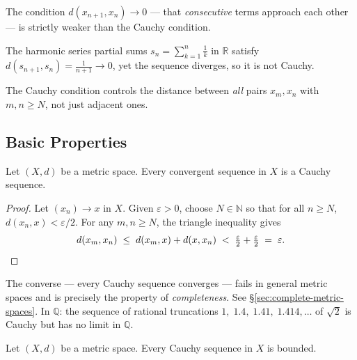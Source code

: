 \begin{remark*}
The condition $d(x_{n+1}, x_n) \to 0$ --- that \emph{consecutive} terms
approach each other --- is strictly weaker than the Cauchy condition.

The harmonic series partial sums $s_n = \sum_{k=1}^n \frac{1}{k}$ in
$\mathbb{R}$ satisfy $d(s_{n+1}, s_n) = \frac{1}{n+1} \to 0$, yet the
sequence diverges, so it is not Cauchy.

The Cauchy condition controls the distance between \emph{all} pairs
$x_m, x_n$ with $m,n \ge N$, not just adjacent ones.
\end{remark*}

\subsection{Basic Properties}
\label{sec:cauchy-basic-properties}

\begin{proposition}
\label{prop:convergent-implies-cauchy}
Let $(X,d)$ be a metric space.
Every convergent sequence in $X$ is a Cauchy sequence.
\end{proposition}

\begin{proof}
Let $(x_n) \to x$ in $X$.
Given $\varepsilon > 0$, choose $N \in \mathbb{N}$ so that for all
$n \ge N$, $d(x_n, x) < \varepsilon/2$.
For any $m, n \ge N$, the triangle inequality gives
\[
  d(x_m, x_n)
  \;\le\;
  d(x_m, x) + d(x, x_n)
  \;<\;
  \tfrac{\varepsilon}{2} + \tfrac{\varepsilon}{2}
  \;=\;
  \varepsilon. \qedhere
\]
\end{proof}

\begin{remark*}
The converse --- every Cauchy sequence converges --- fails in general
metric spaces and is precisely the property of \emph{completeness}.
See \hyperref[sec:complete-metric-spaces]{\S\ref*{sec:complete-metric-spaces}}.
In $\mathbb{Q}$: the sequence of rational truncations
$1,\; 1.4,\; 1.41,\; 1.414, \ldots$
of $\sqrt{2}$ is Cauchy but has no limit in $\mathbb{Q}$.
\end{remark*}

\begin{proposition}
\label{prop:cauchy-bounded}
Let $(X,d)$ be a metric space.
Every Cauchy sequence in $X$ is bounded.
\end{proposition}

